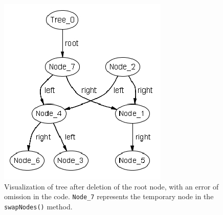     \begin{singlespacing}
    \begin{figure}[H]
    \centering
    \includegraphics[scale=0.75]{Figures/commentedOutWithBetterNumber_post}
    \caption[Visualization of tree after deletion of root (error or omission)]{Visualization of tree
    after deletion of the root node, with an error of omission in the code.
    \texttt{Node\_7} represents the temporary node in the \texttt{swapNodes()} method.}
    \label{fig:tree_commentedOut_mainBody}
    \end{figure}
    \end{singlespacing}
